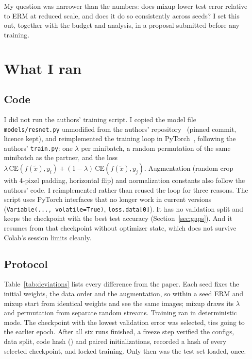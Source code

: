 \documentclass[conference]{IEEEtran}
\begin{document}
My question was narrower than the numbers: does mixup lower test error relative to ERM at reduced
scale, and does it do so consistently across seeds? I set this out, together with the budget and
analysis, in a proposal submitted before any training.

\section{What I ran}
\subsection{Code}
I did not run the authors' training script. I copied the model file \texttt{models/resnet.py}
unmodified from the authors' repository~\cite{mixupcode} (pinned commit, licence kept), and
reimplemented the training loop in PyTorch~\cite{paszke2019pytorch}, following the authors'
\texttt{train.py}: one $\lambda$ per minibatch, a random permutation of the same minibatch as the
partner, and the loss $\lambda\,\mathrm{CE}(f(\tilde{x}),y_i)+(1-\lambda)\,\mathrm{CE}(f(\tilde{x}),y_j)$.
Augmentation (random crop with 4-pixel padding, horizontal flip) and normalization constants also
follow the authors' code. I reimplemented rather than reused the loop for three reasons. The script
uses PyTorch interfaces that no longer work in current versions (\texttt{Variable(..., volatile=True)},
\texttt{loss.data[0]}). It has no validation split and keeps the checkpoint with the best test
accuracy (Section~\ref{sec:gaps}). And it resumes from that checkpoint without optimizer state, which
does not survive Colab's session limits cleanly.

\subsection{Protocol}
Table~\ref{tab:deviations} lists every difference from the paper. Each seed fixes the initial
weights, the data order and the augmentation, so within a seed ERM and mixup start from identical
weights and see the same images; mixup draws its $\lambda$ and permutation from separate random
streams. Training ran in deterministic mode. The checkpoint with the lowest validation error was
selected, ties going to the earlier epoch. After all six runs finished, a freeze step verified the
configs, data split, code hash (\texttt{\SourceHash}) and paired initializations, recorded a hash of
every selected checkpoint, and locked training. Only then was the test set loaded, once.
\end{document}
